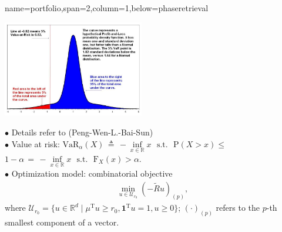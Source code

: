\documentclass[a0paper,portrait]{baposter}
\newcommand{\zz}{^{\mathrm{T}}}
\newcommand{\mR}{\mathbb{R}}
\newcommand{\R}{\mathbb{R}}
\newcommand{\st}{\;\mathrm{s.t.}\;}
\begin{document}
\begin{poster}
{name=portfolio,span=2,column=1,below=phaseretrieval}{
\begin{minipage}{68mm}
\includegraphics[width=\linewidth,height=42mm]{Var.jpg}
\end{minipage}
\hfil
\begin{minipage}{82mm}
\indent $\bullet$  Details refer to {\color{purple}
(Peng-Wen-L.-Bai-Sun)}   \cite{WenPengLiu2012} \\[1mm]
%
\indent $\bullet$  Value at risk: ${\mathrm{VaR}}_{\alpha}(X) \,\triangleq\, - \inf\limits_{x\in\mR} x
\, ~\st~ \,
{\mathrm{P}}(X>x)\leq$\\
\indent \quad $1-\alpha \,=\, - \inf\limits_{x\in\mR} x \,
~\st~ \, {\mathrm{F}}_X(x)
> \alpha$.\\[1mm]
%
\indent $\bullet$ {\color{blue} Optimization model: \color{mygreen} combinatorial objective}
\vspace{-2mm}
\begin{eqnarray*}
\min\limits_{u\in \mathcal{U}_{r_0}} (-\tilde{R}u)_{(p)},
\end{eqnarray*}
where $\mathcal{U}_{r_0} =\{ u \in \R^d \mid \mu\zz u \geq r_0,
\mathbf{1}\zz u = 1, u \ge 0 \}$; $(\cdot)_{(p)}$ refers to the
$p$-th smallest component of a vector.
\end{minipage}
\\[1mm]

}
\end{poster}
\end{document}
